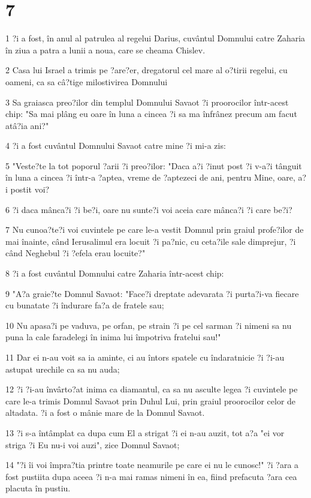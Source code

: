 \chapter{7}

\par 1 ?i a fost, în anul al patrulea al regelui Darius, cuvântul Domnului catre Zaharia în ziua a patra a lunii a noua, care se cheama Chislev.
\par 2 Casa lui Israel a trimis pe ?are?er, dregatorul cel mare al o?tirii regelui, cu oameni, ca sa câ?tige milostivirea Domnului
\par 3 Sa graiasca preo?ilor din templul Domnului Savaot ?i proorocilor într-acest chip: "Sa mai plâng eu oare în luna a cincea ?i sa ma înfrânez precum am facut atâ?ia ani?"
\par 4 ?i a fost cuvântul Domnului Savaot catre mine ?i mi-a zis:
\par 5 "Veste?te la tot poporul ?arii ?i preo?ilor: "Daca a?i ?inut post ?i v-a?i tânguit în luna a cincea ?i într-a ?aptea, vreme de ?aptezeci de ani, pentru Mine, oare, a?i postit voi?
\par 6 ?i daca mânca?i ?i be?i, oare nu sunte?i voi aceia care mânca?i ?i care be?i?
\par 7 Nu cunoa?te?i voi cuvintele pe care le-a vestit Domnul prin graiul profe?ilor de mai înainte, când Ierusalimul era locuit ?i pa?nic, cu ceta?ile sale dimprejur, ?i când Neghebul ?i ?efela erau locuite?"
\par 8 ?i a fost cuvântul Domnului catre Zaharia într-acest chip:
\par 9 "A?a graie?te Domnul Savaot: "Face?i dreptate adevarata ?i purta?i-va fiecare cu bunatate ?i îndurare fa?a de fratele sau;
\par 10 Nu apasa?i pe vaduva, pe orfan, pe strain ?i pe cel sarman ?i nimeni sa nu puna la cale faradelegi în inima lui împotriva fratelui sau!"
\par 11 Dar ei n-au voit sa ia aminte, ci au întors spatele cu îndaratnicie ?i ?i-au astupat urechile ca sa nu auda;
\par 12 ?i ?i-au învârto?at inima ca diamantul, ca sa nu asculte legea ?i cuvintele pe care le-a trimis Domnul Savaot prin Duhul Lui, prin graiul proorocilor celor de altadata. ?i a fost o mânie mare de la Domnul Savaot.
\par 13 ?i s-a întâmplat ca dupa cum El a strigat ?i ei n-au auzit, tot a?a "ei vor striga ?i Eu nu-i voi auzi", zice Domnul Savaot;
\par 14 "?i îi voi împra?tia printre toate neamurile pe care ei nu le cunosc!" ?i ?ara a fost pustiita dupa aceea ?i n-a mai ramas nimeni în ea, fiind prefacuta ?ara cea placuta în pustiu.

